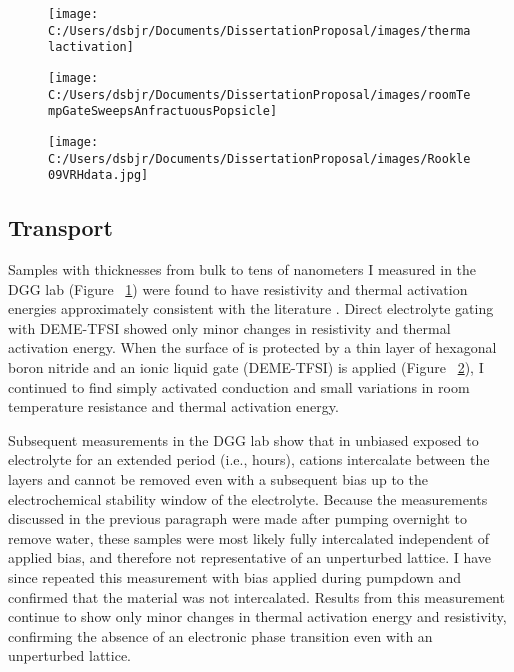 \documentclass[11pt]{article}
\begin{document}
\begin{figure}
\centering
\centering 
  {\texttt{[image: C:/Users/dsbjr/Documents/DissertationProposal/images/thermalactivation]}}
  \captionsetup{width=0.5\textwidth}
  \label{fig:f2}
\end{figure}
\begin{figure}
\centering
  {\texttt{[image: C:/Users/dsbjr/Documents/DissertationProposal/images/roomTempGateSweepsAnfractuousPopsicle]}}
  \captionsetup{width=0.5\textwidth}
  \label{fig:f3}
\end{figure}
\begin{figure}
\centering
	{\texttt{[image: C:/Users/dsbjr/Documents/DissertationProposal/images/Rookle09VRHdata.jpg]}}
	\captionsetup{width=0.5\textwidth}
  \label{fig:f4}
\end{figure}

\subsection{Transport}

Samples with thicknesses from bulk to tens of nanometers I measured in the DGG lab (Figure ~\ref{fig:f2}) were found to have resistivity and thermal activation energies approximately consistent with the literature \cite{Rojas1983}. Direct electrolyte gating with DEME-TFSI showed only minor changes in resistivity and thermal activation energy. When the surface of \rucl is protected by a thin layer of hexagonal boron nitride and an ionic liquid gate (DEME-TFSI) is applied (Figure ~\ref{fig:f3}), I continued to find simply activated conduction and small variations in room temperature resistance and thermal activation energy.

Subsequent measurements in the DGG lab show that in unbiased \rucl exposed to electrolyte for an extended period (i.e., hours), cations intercalate between the layers and cannot be removed even with a subsequent bias up to the electrochemical stability window of the electrolyte. Because the measurements discussed in the previous paragraph were made after pumping overnight to remove water, these samples were most likely fully intercalated independent of applied bias, and therefore not representative of an unperturbed lattice. I have since repeated this measurement with bias applied during pumpdown and confirmed that the material was not intercalated. Results from this measurement continue to show only minor changes in thermal activation energy and resistivity, confirming the absence of an electronic phase transition even with an unperturbed lattice.
\end{document}
